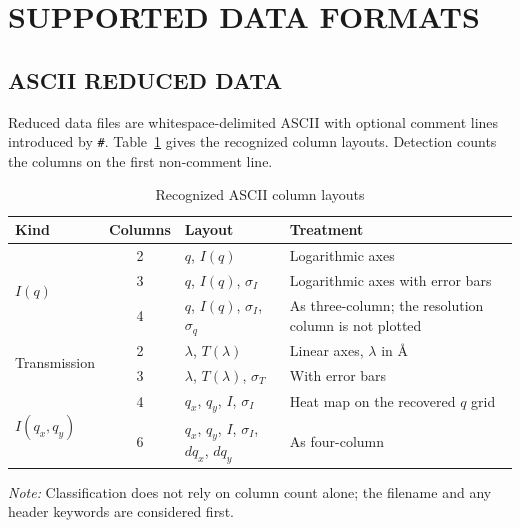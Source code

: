 \documentclass[tm]{ornltm}
\begin{document}
\section{SUPPORTED DATA FORMATS}
\label{sec:formats}

\subsection{ASCII REDUCED DATA}

Reduced data files are whitespace-delimited ASCII with optional comment lines
introduced by \texttt{\#}. Table~\ref{tab:formats} gives the recognized column
layouts. Detection counts the columns on the first non-comment line.

\begin{table}[ht]
  \centering
  \begin{threeparttable}
  \caption{Recognized ASCII column layouts}
  \label{tab:formats}
  \small
  \begin{tabular}{l c l p{}}
    \toprule
    Kind & Columns & Layout & Treatment \\
    \midrule
    \multirow{3}{*}{$I(q)$}
      & 2 & $q$, $I(q)$ & Logarithmic axes \\
      & 3 & $q$, $I(q)$, $\sigma_I$ & Logarithmic axes with error bars \\
      & 4 & $q$, $I(q)$, $\sigma_I$, $\sigma_q$ & As three-column; the
        resolution column is not plotted \\
    \midrule
    \multirow{2}{*}{Transmission}
      & 2 & $\lambda$, $T(\lambda)$ & Linear axes, $\lambda$ in \AA \\
      & 3 & $\lambda$, $T(\lambda)$, $\sigma_T$ & With error bars \\
    \midrule
    \multirow{2}{*}{$I(q_x,q_y)$}
      & 4 & $q_x$, $q_y$, $I$, $\sigma_I$ & Heat map on the recovered
        $q$ grid \\
      & 6 & $q_x$, $q_y$, $I$, $\sigma_I$, $dq_x$, $dq_y$ & As four-column \\
    \bottomrule
  \end{tabular}
  \begin{tablenotes}
    \item \emph{Note:} Classification does not rely on column count alone; the
    filename and any header keywords are considered first.
  \end{tablenotes}
  \end{threeparttable}
\end{table}
\end{document}
